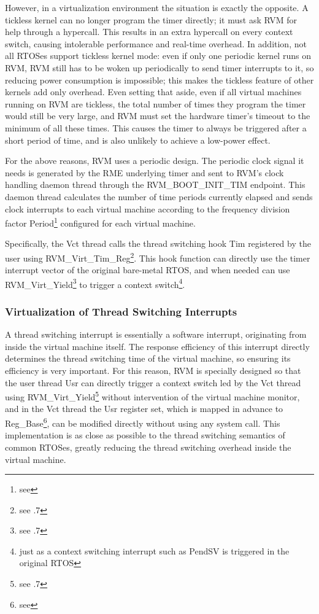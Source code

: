 However, in a virtualization environment the situation is exactly the opposite. A tickless kernel can no longer program the timer directly; it must ask RVM for help through a hypercall. This results in an extra hypercall on every context switch, causing intolerable performance and real-time overhead. In addition, not all RTOSes support tickless kernel mode: even if only one periodic kernel runs on RVM, RVM still has to be woken up periodically to send timer interrupts to it, so reducing power consumption is impossible; this makes the tickless feature of other kernels add only overhead. Even setting that aside, even if all virtual machines running on RVM are tickless, the total number of times they program the timer would still be very large, and RVM must set the hardware timer's timeout to the minimum of all these times. This causes the timer to always be triggered after a short period of time, and is also unlikely to achieve a low-power effect.

For the above reasons, RVM uses a periodic design. The periodic clock signal it needs is generated by the RME underlying timer and sent to RVM's clock handling daemon thread through the RVM\_BOOT\_INIT\_TIM endpoint. This daemon thread calculates the number of time periods currently elapsed and sends clock interrupts to each virtual machine according to the frequency division factor Period\footnote{see } configured for each virtual machine.

Specifically, the Vct thread calls the thread switching hook Tim registered by the user using RVM\_Virt\_Tim\_Reg\footnote{see .7}. This hook function can directly use the timer interrupt vector of the original bare-metal RTOS, and when needed can use RVM\_Virt\_Yield\footnote{see .7} to trigger a context switch\footnote{just as a context switching interrupt such as PendSV is triggered in the original RTOS}.

\subsubsection{Virtualization of Thread Switching Interrupts}\label{subsubsec:2-2-4-2}

A thread switching interrupt is essentially a software interrupt, originating from inside the virtual machine itself. The response efficiency of this interrupt directly determines the thread switching time of the virtual machine, so ensuring its efficiency is very important. For this reason, RVM is specially designed so that the user thread Usr can directly trigger a context switch led by the Vct thread using RVM\_Virt\_Yield\footnote{see .7} without intervention of the virtual machine monitor, and in the Vct thread the Usr register set, which is mapped in advance to Reg\_Base\footnote{see }, can be modified directly without using any system call. This implementation is as close as possible to the thread switching semantics of common RTOSes, greatly reducing the thread switching overhead inside the virtual machine.

